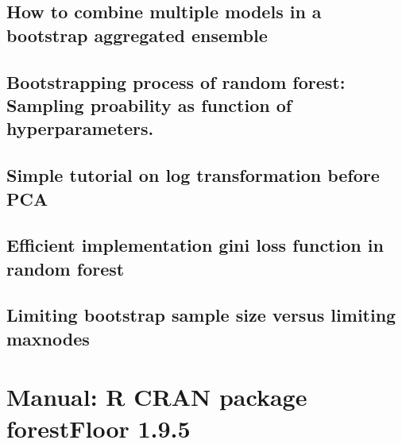 \subsection{How to combine multiple models in a bootstrap aggregated ensemble}

\label{CV8_combineBagging}

\subsection{Bootstrapping process of random forest: Sampling proability as function of hyperparameters.}

\label{CV9_RFsampling}

\subsection{Simple tutorial on log transformation before PCA}

\label{CV10_PCAlogTransform}

\subsection{Efficient implementation gini loss function in random forest}

\label{CV11_RFginigain}

\subsection{Limiting bootstrap sample size versus limiting maxnodes}

\label{CV12_RFsampsize}


\section{Manual: R CRAN package forestFloor 1.9.5}



